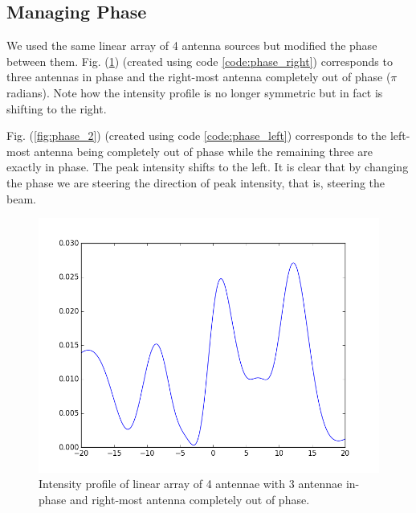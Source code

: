 \subsection{Managing Phase}

We used the same linear array of 4 antenna sources but modified the phase between them. Fig. (\ref{fig:phase_1}) (created using code \ref{code:phase_right}) corresponds to three antennas in phase and the right-most antenna completely out of phase ($\pi$ radians). Note how the intensity profile is no longer symmetric but in fact is shifting to the right. 

Fig. (\ref{fig:phase_2}) (created using code \ref{code:phase_left}) corresponds to the left-most antenna being completely out of phase while the remaining three are exactly in phase. The peak intensity shifts to the left. It is clear that by changing the phase we are steering the direction of peak intensity, that is, steering the beam.

\begin{figure}[!h]
	\centering	
	\includegraphics[scale=0.45]{figure_3.png}
    \caption{\label{fig:phase_1} Intensity profile of linear array of 4 antennae with 3 antennae in-phase and right-most antenna completely out of phase.}
\end{figure}

